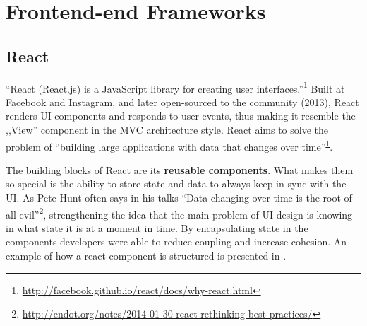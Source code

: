 \section{Frontend-end Frameworks}
\label{sec:frontend}

\subsection{React}
\label{sub-sec:react}

``React (React.js) is a JavaScript library for creating user interfaces.''\footnote{\label{why-react}\url{http://facebook.github.io/react/docs/why-react.html}} Built at Facebook and Instagram, and later open-sourced to the community (2013), React renders UI components and responds to user events, thus making it resemble the ,,View'' component in the MVC architecture style. React aims to solve the problem of ``building large applications with data that changes over time''\textsuperscript{\ref{why-react}}.

The building blocks of React are its \textbf{reusable components}. What makes them so special is the ability to store state and data to always keep in sync with the UI. As Pete Hunt often says in his talks ``Data changing over time is the root of all evil''\footnote{\url{http://endot.org/notes/2014-01-30-react-rethinking-best-practices/}}, strengthening the idea that the main problem of UI design is knowing in what state it is at a moment in time. By encapsulating state in the components developers were able to reduce coupling and increase cohesion. An example of how a react component is structured is presented in .



